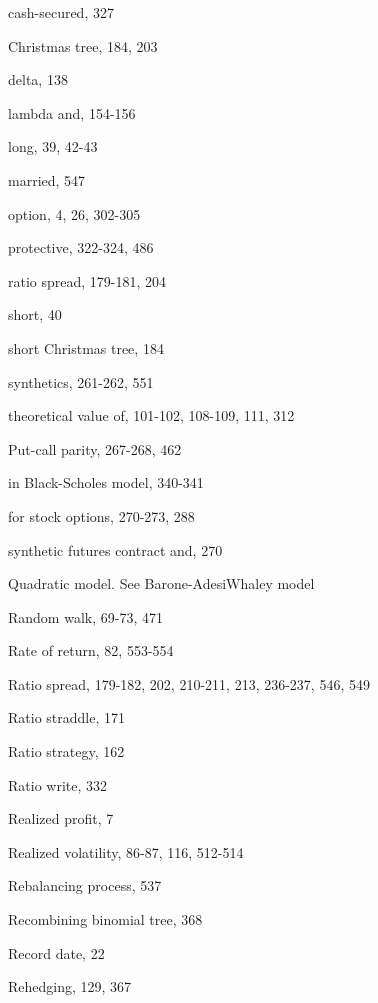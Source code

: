 \noindent cash-secured, 327\par
\noindent Christmas tree, 184, 203\par
\noindent delta, 138\par
\noindent lambda and, 154-156\par
\noindent long, 39, 42-43\par
\noindent married, 547\par
\noindent option, 4, 26, 302-305\par
\noindent protective, 322-324, 486\par
\noindent ratio spread, 179-181, 204\par
\noindent short, 40\par
\noindent short Christmas tree, 184\par
\noindent synthetics, 261-262, 551\par
\noindent theoretical value of, 101-102, 108-109, 111, 312\par
\noindent Put-call parity, 267-268, 462\par
\noindent in Black-Scholes model, 340-341\par
\noindent for stock options, 270-273, 288\par
\noindent synthetic futures contract and, 270\par
\noindent Quadratic model. See Barone-AdesiWhaley model\par
\noindent Random walk, 69-73, 471\par
\noindent Rate of return, 82, 553-554\par
Ratio spread, 179-182, 202, 210-211, 213, 236-237, 546, 549\par
\noindent Ratio straddle, 171\par
\noindent Ratio strategy, 162\par
\noindent Ratio write, 332\par
\noindent Realized profit, 7\par
\noindent Realized volatility, 86-87, 116, 512-514\par
\noindent Rebalancing process, 537\par
\noindent Recombining binomial tree, 368\par
\noindent Record date, 22\par
\noindent Rehedging, 129, 367\par


